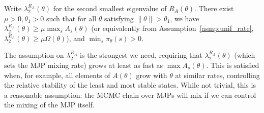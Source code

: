\begin{assumption}
  Write $\lambda^{R_A}_2(\theta)$ for the second smallest eigenvalue of
    $R_A(\theta)$. There exist $\mu > 0, \theta_1 > 0$
    such that for all $\theta$ satisfying $ \| \theta \|> \theta_1$, 
    we have $ \lambda^{R_A}_2(\theta) \geq \mu \max_s A_s(\theta)$
    (or equivalently from Assumption~\ref{asmp:unif_rate}, 
    $ \lambda^{R_A}_2(\theta) \geq \mu \Omega(\theta)$),
    and $\min_s \pi_\theta(s) > 0$. 
  \label{asmp:cond_num}
\end{assumption} 
\noindent %
The assumption on $\lambda^{R_A}_2$ is the strongest we need, requiring that 
$\lambda^{R_A}_2(\theta)$ (which sets the MJP mixing rate) grows 
at least as fast as $\max A_s(\theta)$. 
This is satisfied when, for example, all elements of $A(\theta)$ grow 
with $\theta$ at similar rates, controlling the relative stability of 
the least and most stable states.
While not trivial, this is a reasonable assumption: the MCMC chain over MJPs 
will mix if we can control the mixing of the MJP itself.
